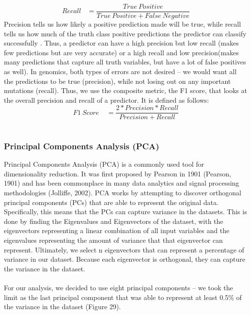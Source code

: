 \documentclass{article}
\begin{document}
\begin{equation}
Recall\ \ \ \ = \frac{True\ Positive}{True \ Positive + False \ Negative} 
\end{equation}
Precision tells us how likely a positive prediction made will be true, while recall tells us how much of the truth class positive predictions the predictor can classify successfully . Thus, a predictor can have a high precision but low recall (makes few predictions but are very accurate) or a high recall and low precision(makes many predictions that capture all truth variables, but have a lot of false positives as well). In genomics, both types of errors are not desired -- we would want all the predictions to be true (precision), while not losing out on any important mutations (recall). Thus, we use the composite metric, the F1 score, that looks at the overall precision and recall of a predictor. It is defined as follows:
\begin{equation}
{F1} \ Score \ \ \  \ \ = \frac{2*Precision*Recall}{Precision + Recall} 
\end{equation}
\\
\subsubsection{Principal Components Analysis (PCA)}
Principal Components Analysis (PCA) is a commonly used tool for dimensionality reduction. It was first proposed by Pearson in 1901 (Pearson, 1901) and has been commonplace in many data analytics and signal processing methodologies (Jolliffe, 2002). PCA works by attempting to discover orthogonal principal components (PCs) that are able to represent the original data. Specifically, this means that the PCs can capture variance in the datasets. This is done by finding the Eigenvalues and Eigenvectors of the dataset, with the eigenvectors representing a linear combination of all input variables and the eigenvalues representing the amount of variance that that eigenvector can represent. Ultimately, we select n eigenvectors that can represent a percentage of variance in our dataset. Because each eigenvector is orthogonal, they can capture the variance in the dataset.\\\\ For our analysis, we decided to use eight principal components -- we took the limit as the last principal component that was able to represent at least 0.5\% of the variance in the dataset (Figure 29).
 
\end{document}
